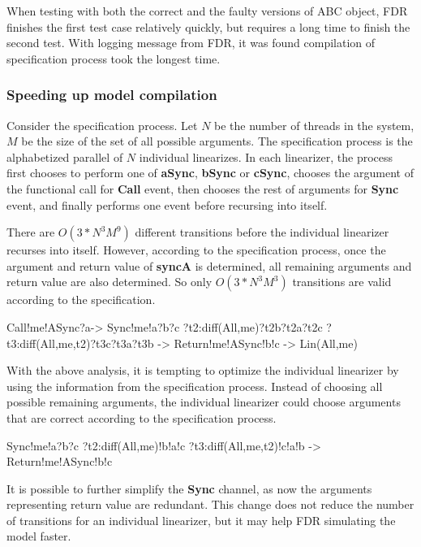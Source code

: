 \documentclass{article}
\begin{document}
When testing with both the correct and the faulty versions of ABC object, FDR finishes the first test case relatively quickly, but requires a long time to finish the second test. With logging message from FDR, it was found compilation of specification process took the longest time. 

\subsubsection{Speeding up model compilation}
Consider the specification process. Let $N$ be the number of threads in the system, $M$ be the size of the set of all possible arguments. The specification process is the alphabetized parallel of $N$ individual linearizes. In each linearizer, the process first chooses to perform one of \textbf{aSync}, \textbf{bSync} or \textbf{cSync}, chooses the argument of the functional call for \textbf{Call} event, then chooses the rest of arguments for \textbf{Sync} event, and finally performs one event before recursing into itself.

There are $O(3*N^3M^9)$ different transitions before the individual linearizer recurses into itself. However, according to the specification process, once the argument and return value of \textbf{syncA} is determined, all remaining arguments and return value are also determined. So only $O(3*N^3M^3)$ transitions are valid according to the specification. 

\begin{cspm}
  Call!me!ASync?a->
    Sync!me!a?b?c 
        ?t2:diff(All,{me})?t2b?t2a?t2c 
        ?t3:diff(All,{me,t2})?t3c?t3a?t3b ->
    Return!me!ASync!b!c ->
    Lin(All,me)
\end{cspm}
    
With the above analysis, it is tempting to optimize the individual linearizer by using the information from the specification process. Instead of choosing all possible remaining arguments, the individual linearizer could choose arguments that are correct according to the specification process.

\begin{cspm}
  Sync!me!a?b?c 
      ?t2:diff(All,{me})!b!a!c
      ?t3:diff(All,{me,t2})!c!a!b ->
  Return!me!ASync!b!c
\end{cspm}
It is possible to further simplify the \textbf{Sync} channel, as now the arguments representing return value are redundant. This change does not reduce the number of transitions for an individual linearizer, but it may help FDR simulating the model faster.
\end{document}
